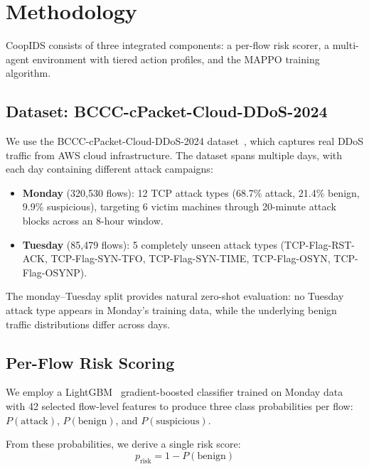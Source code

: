\documentclass[sigconf,nonacm]{acmart}
\begin{document}
\section{Methodology}
\label{sec:method}

CoopIDS consists of three integrated components: a per-flow risk scorer, a multi-agent environment with tiered action profiles, and the MAPPO training algorithm.

\subsection{Dataset: BCCC-cPacket-Cloud-DDoS-2024}

We use the BCCC-cPacket-Cloud-DDoS-2024 dataset~\cite{bccc2024}, which captures real DDoS traffic from AWS cloud infrastructure. The dataset spans multiple days, with each day containing different attack campaigns:

\begin{itemize}
    \item \textbf{Monday} (320,530 flows): 12 TCP attack types (68.7\% attack, 21.4\% benign, 9.9\% suspicious), targeting 6 victim machines through 20-minute attack blocks across an 8-hour window.
    \item \textbf{Tuesday} (85,479 flows): 5 completely unseen attack types (TCP-Flag-RST-ACK, TCP-Flag-SYN-TFO, TCP-Flag-SYN-TIME, TCP-Flag-OSYN, TCP-Flag-OSYNP).
\end{itemize}

The monday--Tuesday split provides natural zero-shot evaluation: no Tuesday attack type appears in Monday's training data, while the underlying benign traffic distributions differ across days.

\subsection{Per-Flow Risk Scoring}
\label{sec:risk}

We employ a LightGBM~\cite{ke2017lightgbm} gradient-boosted classifier trained on Monday data with 42 selected flow-level features to produce three class probabilities per flow: $P(\text{attack})$, $P(\text{benign})$, and $P(\text{suspicious})$.

From these probabilities, we derive a single risk score:
\begin{equation}
    p_\text{risk} = 1 - P(\text{benign})
    \label{eq:prisk}
\end{equation}
\end{document}
